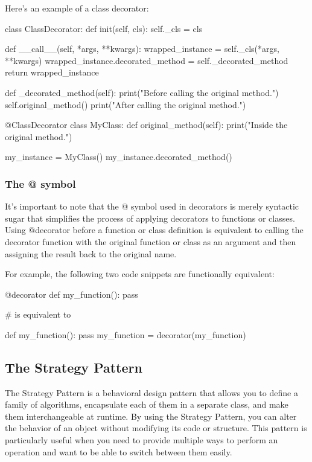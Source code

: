 \documentclass[12pt, a4paper, oneside, justified]{article}
\begin{document}
Here's an example of a class decorator:
\begin{python}
    class ClassDecorator:
        def init(self, cls):
            self._cls = cls

        def __call__(self, *args, **kwargs):
            wrapped_instance = self._cls(*args, **kwargs)
            wrapped_instance.decorated_method = self._decorated_method
            return wrapped_instance

        def _decorated_method(self):
            print("Before calling the original method.")
            self.original_method()
            print("After calling the original method.")

        @ClassDecorator
        class MyClass:
            def original_method(self):
                print("Inside the original method.")

        my_instance = MyClass()
        my_instance.decorated_method()
\end{python}

\subsubsection*{The @ symbol}
It's important to note that the @ symbol used in decorators is merely syntactic sugar that simplifies
the process of applying decorators to functions or classes. Using @decorator before a function
or class definition is equivalent to calling the decorator function with the original function or
class as an argument and then assigning the result back to the original name. 

For example, the following two code snippets are functionally equivalent:
\begin{python}
    @decorator
    def my_function():
        pass

    # is equivalent to

    def my_function():
        pass
    my_function = decorator(my_function)
\end{python}

\subsection{The Strategy Pattern}
The Strategy Pattern is a behavioral design pattern that allows you to define a family of algorithms,
encapsulate each of them in a separate class, and make them interchangeable at runtime. By
using the Strategy Pattern, you can alter the behavior of an object without modifying its code or
structure. This pattern is particularly useful when you need to provide multiple ways to perform
an operation and want to be able to switch between them easily.
\end{document}
